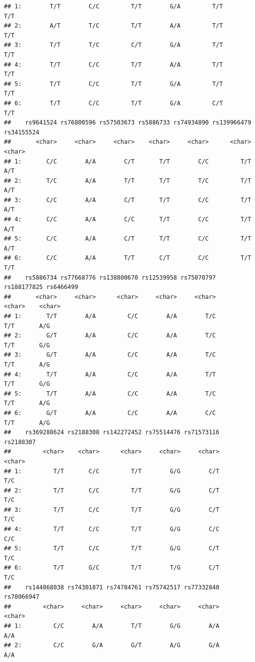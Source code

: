 \documentclass[
]{article}
\begin{document}
\begin{verbatim}
## 1:        T/T        C/C         T/T        G/A         T/T        T/T
## 2:        A/T        T/C         T/T        A/A         T/T        T/T
## 3:        T/T        T/C         C/T        G/A         T/T        T/T
## 4:        T/T        C/C         T/T        A/A         T/T        T/T
## 5:        T/T        C/C         T/T        G/A         T/T        T/T
## 6:        T/T        C/C         T/T        G/A         C/T        T/T
##    rs9641524 rs76800596 rs57503673 rs5886733 rs74934890 rs139966479 rs34155524
##       <char>     <char>     <char>    <char>     <char>      <char>     <char>
## 1:       C/C        A/A        C/T       T/T        C/C         T/T        A/T
## 2:       T/C        A/A        T/T       T/T        T/C         T/T        A/T
## 3:       C/C        A/A        C/T       T/T        C/C         T/T        A/T
## 4:       C/C        A/A        C/C       T/T        C/C         T/T        A/T
## 5:       C/C        A/A        C/T       T/T        C/C         T/T        A/T
## 6:       C/C        A/A        T/T       C/T        C/C         T/T        T/T
##    rs5886734 rs77668776 rs138800670 rs12539958 rs75070797 rs188177825 rs6466499
##       <char>     <char>      <char>     <char>     <char>      <char>    <char>
## 1:       T/T        A/A         C/C        A/A        T/C         T/T       A/G
## 2:       G/T        A/A         C/C        A/A        T/C         T/T       G/G
## 3:       G/T        A/A         C/C        A/A        T/C         T/T       A/G
## 4:       T/T        A/A         C/C        A/A        T/T         T/T       G/G
## 5:       T/T        A/A         C/C        A/A        T/C         T/T       A/G
## 6:       G/T        A/A         C/C        A/A        C/C         T/T       A/G
##    rs369288624 rs2188308 rs142272452 rs75514476 rs71573116 rs2188307
##         <char>    <char>      <char>     <char>     <char>    <char>
## 1:         T/T       C/C         T/T        G/G        C/T       T/C
## 2:         T/T       C/C         T/T        G/G        C/T       T/C
## 3:         T/T       C/C         T/T        G/G        C/T       T/C
## 4:         T/T       C/C         T/T        G/G        C/C       C/C
## 5:         T/T       C/C         T/T        G/G        C/T       T/C
## 6:         T/T       G/C         T/T        T/G        C/T       T/C
##    rs144868038 rs74301871 rs74784761 rs75742517 rs77332840 rs78066947
##         <char>     <char>     <char>     <char>     <char>     <char>
## 1:         C/C        A/A        T/T        G/G        A/A        A/A
## 2:         C/C        G/A        G/T        A/G        G/A        A/A

\end{verbatim}
\end{document}
